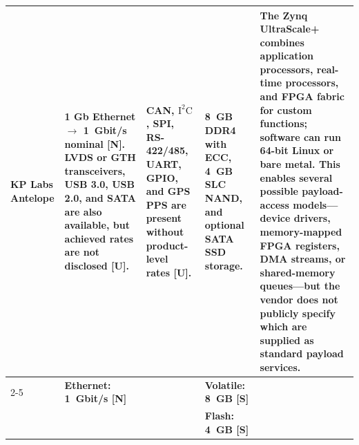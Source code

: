 \documentclass[10pt]{../datasheet}
\let\cite\citep
\begin{document}
\begin{landscape}
\begin{longtable}{|p{3.2cm}|p{4.5cm}|p{4.5cm}|p{4.5cm}|p{5.5cm}|}
    KP Labs Antelope \cite{kplabs_antelope_ds}                         &
    1 Gb Ethernet $\rightarrow$ 1~Gbit/s nominal [N]. LVDS or GTH transceivers,
    USB 3.0, USB 2.0, and SATA are also available, but achieved rates are not
    disclosed [U].                                                     & CAN, $\text{I}^2\text{C}$, SPI, RS-422/485,
    UART, GPIO, and GPS PPS are present without product-level rates [U].
                                                                       & 8~GB DDR4 with ECC, 4~GB SLC NAND, and optional SATA SSD storage.
                                                                       & The Zynq UltraScale+ combines application processors, real-time
    processors, and FPGA fabric for custom functions; software can run 64-bit
    Linux or bare metal. This enables several possible payload-access
    models---device drivers, memory-mapped FPGA registers, DMA streams, or
    shared-memory queues---but the vendor does not publicly specify which are
    supplied as standard payload services.
    \\
    \cline{2-5}
                                                                       & \textbf{Ethernet: 1~Gbit/s [N]}
                                                                       &
                                                                       & \textbf{Volatile: 8~GB [S]}                                                &                                                                                                \\
                                                                       &                                                                            &                                                  & \textbf{Flash: 4~GB [S]}                  & \\ \hline\hline


\end{longtable}
\end{landscape}
\end{document}
